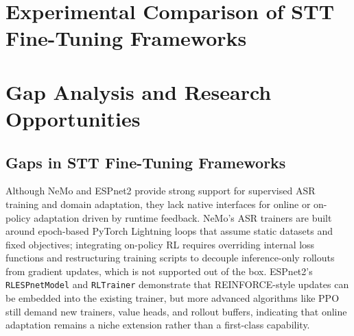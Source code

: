 \documentclass[conference]{IEEEtran}
\begin{document}
\section{Experimental Comparison of STT Fine-Tuning Frameworks}


\pagebreak

\section{Gap Analysis and Research Opportunities}


\label{sec:gaps}

\subsection{Gaps in STT Fine-Tuning Frameworks}

Although NeMo and ESPnet2 provide strong support for supervised ASR training and domain adaptation, they lack native interfaces for online or on-policy adaptation driven by runtime feedback.
NeMo’s ASR trainers are built around epoch-based PyTorch Lightning loops that assume static datasets and fixed objectives; integrating on-policy RL requires overriding internal loss functions and restructuring training scripts to decouple inference-only rollouts from gradient updates, which is not supported out of the box.
ESPnet2’s \texttt{RLESPnetModel} and \texttt{RLTrainer} demonstrate that REINFORCE-style updates can be embedded into the existing trainer, but more advanced algorithms like PPO still demand new trainers, value heads, and rollout buffers, indicating that online adaptation remains a niche extension rather than a first-class capability.
\end{document}
